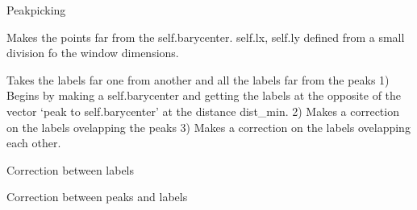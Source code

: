 \documentclass[letterpaper,10pt,openany,oneside]{sphinxmanual}
\begin{document}
\begin{fulllineitems}
\label{rst/visu2d:Visu.label_2D.PEAKPICK}
Peakpicking

\begin{fulllineitems}
\label{rst/visu2d:Visu.label_2D.PEAKPICK.baryc_far}
Makes the points far from the self.barycenter.
self.lx, self.ly defined from a small division fo the window dimensions.

\end{fulllineitems}


\begin{fulllineitems}
\label{rst/visu2d:Visu.label_2D.PEAKPICK.barycenter_method}
Takes the labels far one from another and all the labels far from the peaks
1) Begins by  making a self.barycenter and getting the labels at the opposite of the vector `peak to self.barycenter' 
at the distance dist\_min.
2) Makes a correction on the labels ovelapping the peaks
3) Makes a correction on the labels ovelapping each other.

\end{fulllineitems}


\begin{fulllineitems}
\label{rst/visu2d:Visu.label_2D.PEAKPICK.correc_label_label}
Correction between labels

\end{fulllineitems}


\begin{fulllineitems}
\label{rst/visu2d:Visu.label_2D.PEAKPICK.correc_peak_label}
Correction between peaks and labels

\end{fulllineitems}



\end{fulllineitems}
\end{document}
